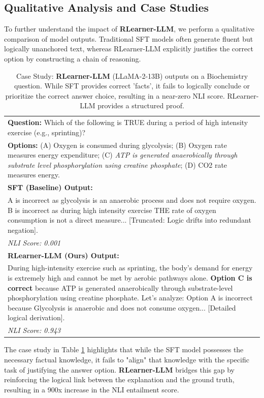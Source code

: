 \subsection{Qualitative Analysis and Case Studies}
To further understand the impact of \textbf{RLearner-LLM}, we perform a qualitative comparison of model outputs. Traditional SFT models often generate fluent but logically unanchored text, whereas RLearner-LLM explicitly justifies the correct option by constructing a chain of reasoning.

\begin{table}[h]
\centering
\small
\begin{tabular}{p{}}
\toprule
\textbf{Question:} Which of the following is TRUE during a period of high intensity exercise (e.g., sprinting)? \\
\textbf{Options:} (A) Oxygen is consumed during glycolysis; (B) Oxygen rate measures energy expenditure; (C) \textit{ATP is generated anaerobically through substrate level phosphorylation using creatine phosphate}; (D) CO2 rate measures energy. \\
\midrule
\textbf{SFT (Baseline) Output:} \\
A is incorrect as glycolysis is an anaerobic process and does not require oxygen. B is incorrect as during high intensity exercise THE rate of oxygen consumption is not a direct measure... [Truncated: Logic drifts into redundant negation]. \\
\textit{NLI Score: 0.001} \\
\midrule
\textbf{RLearner-LLM (Ours) Output:} \\
During high-intensity exercise such as sprinting, the body's demand for energy is extremely high and cannot be met by aerobic pathways alone. \textbf{Option C is correct} because ATP is generated anaerobically through substrate-level phosphorylation using creatine phosphate. Let's analyze: Option A is incorrect because Glycolysis is anaerobic and does not consume oxygen... [Detailed logical derivation]. \\
\textit{NLI Score: 0.943} \\
\bottomrule
\end{tabular}
\caption{Case Study: \textbf{RLearner-LLM} (LLaMA-2-13B) outputs on a Biochemistry question. While SFT provides correct 'facts', it fails to logically conclude or prioritize the correct answer choice, resulting in a near-zero NLI score. RLearner-LLM provides a structured proof.}
\label{tab:case_study}
\end{table}

The case study in Table \ref{tab:case_study} highlights that while the SFT model possesses the necessary factual knowledge, it fails to "align" that knowledge with the specific task of justifying the answer option. \textbf{RLearner-LLM} bridges this gap by reinforcing the logical link between the explanation and the ground truth, resulting in a 900x increase in the NLI entailment score.
